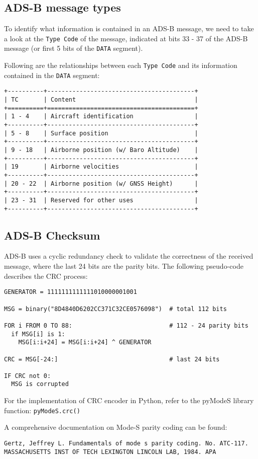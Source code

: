 \subsection{ADS-B message types}\label{ads-b-message-types}

To identify what information is contained in an ADS-B message, we need
to take a look at the \texttt{Type\ Code} of the message, indicated at
bits 33 - 37 of the ADS-B message (or first 5 bits of the \texttt{DATA}
segment).

Following are the relationships between each \texttt{Type\ Code} and its
information contained in the \texttt{DATA} segment:

\begin{verbatim}
+----------+-----------------------------------------+
| TC       | Content                                 |
+==========+=========================================+
| 1 - 4    | Aircraft identification                 |
+----------+-----------------------------------------+
| 5 - 8    | Surface position                        |
+----------+-----------------------------------------+
| 9 - 18   | Airborne position (w/ Baro Altitude)    |
+----------+-----------------------------------------+
| 19       | Airborne velocities                     |
+----------+-----------------------------------------+
| 20 - 22  | Airborne position (w/ GNSS Height)      |
+----------+-----------------------------------------+
| 23 - 31  | Reserved for other uses                 |
+----------+-----------------------------------------+
\end{verbatim}

\subsection{ADS-B Checksum}\label{ads-b-checksum}

ADS-B uses a cyclic redundancy check to validate the correctness of the
received message, where the last 24 bits are the parity bits. The
following pseudo-code describes the CRC process:

\begin{verbatim}
GENERATOR = 1111111111111010000001001

MSG = binary("8D4840D6202CC371C32CE0576098")  # total 112 bits

FOR i FROM 0 TO 88:                           # 112 - 24 parity bits
  if MSG[i] is 1:
    MSG[i:i+24] = MSG[i:i+24] ^ GENERATOR

CRC = MSG[-24:]                               # last 24 bits

IF CRC not 0:
  MSG is corrupted

\end{verbatim}

For the implementation of CRC encoder in Python, refer to the pyModeS
library function: \texttt{pyModeS.crc()}

A comprehensive documentation on Mode-S parity coding can be found:

\begin{verbatim}
Gertz, Jeffrey L. Fundamentals of mode s parity coding. No. ATC-117.
MASSACHUSETTS INST OF TECH LEXINGTON LINCOLN LAB, 1984. APA
\end{verbatim}
